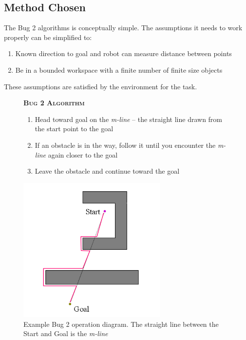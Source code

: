 \documentclass[11pt, a4paper]{article}
\begin{document}


\subsection{Method Chosen}

The Bug 2 algorithms is conceptually simple. The assumptions it needs to work properly can 
be simplified to:

\begin{enumerate}

	\item Known direction to goal and robot can measure distance between points
	\item Be in a bounded workspace with a finite number of finite size objects

\end{enumerate}

These assumptions are satisfied by the environment for the task.

\begin{figure}[H]
  \textbf{\scshape Bug 2 Algorithm}
  
  \begin{enumerate}
    
  \item Head toward goal on the \textit{m-line} -- the straight line drawn from the start point to the goal
  \item If an obstacle is in the way, follow it until you encounter the \textit{m-line} again closer to the goal
  \item Leave the obstacle and continue toward the goal
    
  \end{enumerate}
\end{figure}

\begin{figure}[H]
  \begin{center}
    \includegraphics[width=20em]{../assets/bug-algorithm-diagram.png}
    \caption{Example Bug 2 operation diagram.
      The straight line between the Start and Goal is the \textit{m-line}}
  \end{center}
\end{figure}
\end{document}
